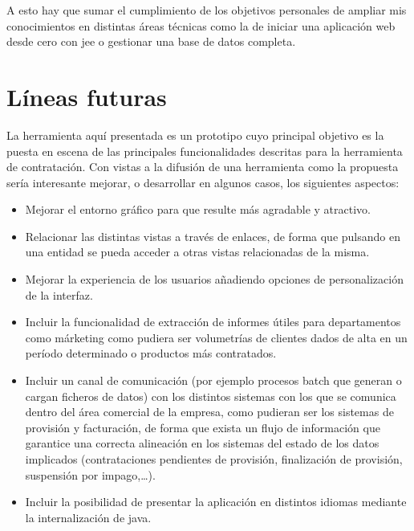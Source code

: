 A esto hay que sumar el cumplimiento de los objetivos personales de ampliar mis conocimientos en distintas áreas técnicas como la de iniciar una aplicación web desde cero con \acrshort{jee} o gestionar una base de datos completa.



\section{Líneas futuras}
\label{sec:futuro}

La herramienta aquí presentada es un prototipo cuyo principal objetivo es la puesta en escena de las principales funcionalidades descritas para la herramienta de contratación. Con vistas a la difusión de una herramienta como la propuesta sería interesante mejorar, o desarrollar en algunos casos, los siguientes aspectos:

\begin{itemize}
\item Mejorar el entorno gráfico para que resulte más agradable y atractivo.
\item Relacionar las distintas vistas a través de enlaces, de forma que pulsando en una entidad se pueda acceder a otras vistas relacionadas de la misma.
\item Mejorar la experiencia de los usuarios añadiendo opciones de personalización de la interfaz.
\item Incluir la funcionalidad de extracción de informes útiles para departamentos como márketing como pudiera ser volumetrías de clientes dados de alta en un período determinado o productos más contratados.
\item Incluir un canal de comunicación (por ejemplo procesos batch que generan o cargan ficheros de datos) con los distintos sistemas con los que se comunica dentro del área comercial de la empresa, como pudieran ser los sistemas de provisión y facturación, de forma que exista un flujo de información que garantice una correcta alineación en los sistemas del estado de los datos implicados (contrataciones pendientes de provisión, finalización de provisión, suspensión por impago,\dots).
\item Incluir la posibilidad de presentar la aplicación en distintos idiomas mediante la internalización de java.
\end{itemize}
